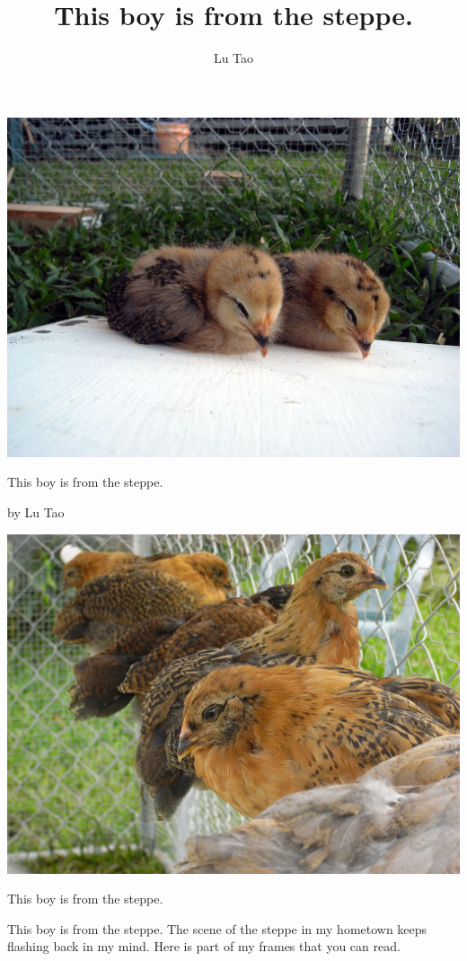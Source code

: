 \documentclass[10pt,final,openany]{book}
\title{This boy is from the steppe.}
\author{Lu Tao}
\begin{document}
\pagestyle{empty}

\includegraphics[width=8in]{R20090531-173219-master}

\begin{center}
{\huge This boy is from the steppe.}

{\Large by Lu Tao}
\end{center}
\newpage



\newpage

\pagestyle{empty}

\includegraphics[width=8in]{R20090619-103748}

\begin{center}
{\LARGE This boy is from the steppe.}
\end{center}

{\large This boy is from the steppe.
The scene of the steppe in my hometown keeps flashing back in my mind.  Here is part of my frames that you can read. 
}
\end{document}
